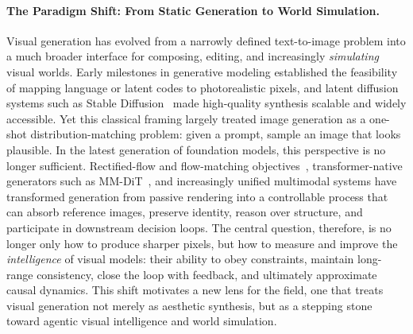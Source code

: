 \vspace{1em}
\vspace{-0.4em}

\paragraph{The Paradigm Shift: From Static Generation to World Simulation.}
Visual generation has evolved from a narrowly defined text-to-image problem into a much broader interface for composing, editing, and increasingly \emph{simulating} visual worlds. Early milestones in generative modeling established the feasibility of mapping language or latent codes to photorealistic pixels, and latent diffusion systems such as Stable Diffusion~\citep{rombach2022stablediffusion} made high-quality synthesis scalable and widely accessible. Yet this classical framing largely treated image generation as a one-shot distribution-matching problem: given a prompt, sample an image that looks plausible. In the latest generation of foundation models, this perspective is no longer sufficient. Rectified-flow and flow-matching objectives~\citep{liu2022flow,lipman2023flowmatchinggenerativemodeling}, transformer-native generators such as MM-DiT~\citep{esser2024stablediffusion3}, and increasingly unified multimodal systems have transformed generation from passive rendering into a controllable process that can absorb reference images, preserve identity, reason over structure, and participate in downstream decision loops. The central question, therefore, is no longer only how to produce sharper pixels, but how to measure and improve the \emph{intelligence} of visual models: their ability to obey constraints, maintain long-range consistency, close the loop with feedback, and ultimately approximate causal dynamics. This shift motivates a new lens for the field, one that treats visual generation not merely as aesthetic synthesis, but as a stepping stone toward agentic visual intelligence and world simulation.


